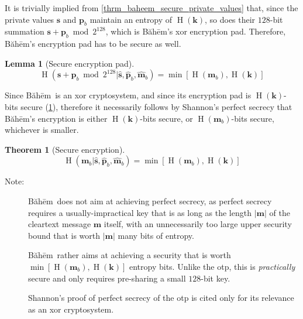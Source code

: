 \documentclass[twocolumn,hidelinks]{article}
\newcommand{\baheem}{Băhēm}
\DeclareMathOperator{\entropy}{H}
\newtheorem{lemma}{Lemma}
\newtheorem{theorem}{Theorem}
\begin{document}
It is trivially implied from \cref{thrm_baheem_secure_private_values} that,
since the private values $\mathbf{s}$ and $\mathbf{p}_b$ maintain an
entropy of $\entropy(\mathbf{k})$, so does their $128$-bit summation
$\mathbf{s} + \mathbf{p}_b \bmod{2^{128}}$, which is \baheem's \gls{xor}
encryption pad.  Therefore, \baheem's encryption pad has to be secure as
well.

\begin{lemma}[Secure encryption pad]
    \[
        \entropy(
            \mathbf{s} + \mathbf{p}_b \bmod{2^{128}}
            | \mathbf{\hat s},
              \mathbf{\hat p}_b,
              \mathbf{\hat m}_b
        )
        = \min[\entropy(\mathbf{m}_b), \entropy(\mathbf{k})]
    \]
    \label{thrm_baheem_secure_encryption_pad}
\end{lemma}

Since \baheem\ is an \gls{xor} cryptosystem, and since its encryption pad
is $\entropy(\mathbf{k})$-bits secure
(\cref{thrm_baheem_secure_encryption_pad}), therefore it necessarily
follows by Shannon's perfect secrecy \cite{perfect_secrecy} that \baheem's
encryption is either $\entropy(\mathbf{k})$-bits secure, or
$\entropy(\mathbf{m}_b)$-bits secure, whichever is smaller.

\begin{theorem}[Secure encryption]
    \[
        \entropy(
            \mathbf{m}_b
            | \mathbf{\hat s},
              \mathbf{\hat p}_b,
              \mathbf{\hat m}_b
        )
        = \min[\entropy(\mathbf{m}_b), \entropy(\mathbf{k})]
    \]
    \label{thrm_baheem_secure}
\end{theorem}

\begin{description}
    \item[Note:] \baheem\ does not aim at achieving perfect secrecy, as
        perfect secrecy requires a usually-impractical key that is as long
        as the length $|\mathbf{m}|$ of the cleartext message $\mathbf{m}$
        itself, with an unnecessarily too large upper security bound that
        is worth $|\mathbf{m}|$ many bits of entropy.

        \baheem\ rather aims at achieving a security that is worth
        $\min[\entropy(\mathbf{m}_b), \entropy(\mathbf{k})]$ entropy bits.
        Unlike the \gls{otp}, this is \emph{practically} secure and only
        requires pre-sharing a small $128$-bit key.

        Shannon's proof of perfect secrecy of the \gls{otp} is cited only
        for its relevance as an \gls{xor} cryptosystem.
\end{description}
\end{document}
